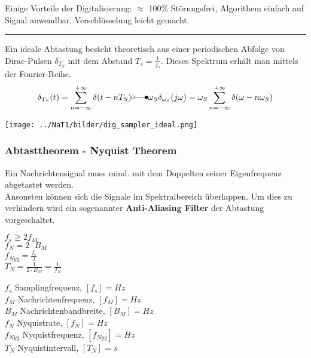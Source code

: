 Einige Vorteile der Digitalisierung: $\approx$ 100\% Störungsfrei, Algorithem einfach auf Signal
anwendbar, Verschlüsselung leicht gemacht.\\

\hrule
{}
Ein ideale Abtastung besteht theoretisch aus einer periodischen Abfolge von Dirac-Pulsen
$\delta_{T_S}$ mit dem Abstand $T_s = \frac{1}{f_s}$. Dieses Spektrum erhält man mittels der
Fourier-Reihe. \\ 
$$ \delta_{T_S}(t) = \sum\limits_{n=-\infty}^{+\infty} \delta(t-nT_S) \laplace 
\omega_S \delta_{\omega_S} (j \omega) = 
\omega_S \sum\limits_{n=-\infty}^{+\infty} \delta(\omega - n \omega_S)$$
	\begin{center}
		\texttt{[image: ../NaT1/bilder/dig\_sampler\_ideal.png]}
	\end{center}

\subsubsection{Abtasttheorem - Nyquist Theorem}
Ein Nachrichtensignal muss mind. mit dem Doppelten seiner Eigenfrequenz abgetastet werden. \\
Ansonsten können sich die Signale im Spektralbereich überlappen.  Um dies zu verhindern wird ein
sogenannter \textbf{Anti-Aliasing Filter} der Abtastung vorgeschaltet.\\
\begin{minipage}[t][2.7cm][c]{8cm}
$ f_s \geq 2 f_M $ \\
$ f_N = 2 \cdot B_M $ \\
$ f_{Nyq} = \frac{f_s}{2}$ \\
$ T_N = \frac{1}{2\cdot B_M} = \frac{1}{f_N} $

\end{minipage}
\begin{minipage}[t][2.7cm][c]{10cm}
	$f_s$ Samplingfrequenz, $[f_s] = Hz$ \\
	$f_M$ Nachrichtenfrequenz, $[f_M] = Hz$ \\
	$B_M$ Nachrichtenbandbreite, $[B_M] = Hz$ \\
	$f_N$ Nyquistrate, $[f_N] = Hz$ \\
	$f_{Nyq}$ Nyquistfrequenz, $[f_{Nyq}] = Hz$ \\
	$T_N$ Nyquistintervall, $[T_N] = s$ \\	
\end{minipage}

